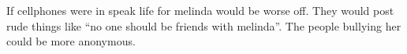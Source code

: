 
\setlength{\parindent}{1cm} %
If cellphones were in speak life for melinda would be worse off.
They would post rude things like ``no one should be friends with melinda''.
The people bullying her could be more anonymous.



